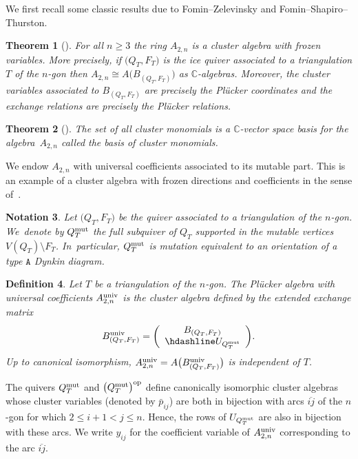 \documentclass[pdftex]{sigma}%
\newtheorem{Theorem}{Theorem}[section]
\newtheorem{Definition}[Theorem]{Definition}
\newtheorem{Notation}[Theorem]{Notation}
\numberwithin{equation}{section}
\begin{document}
We first recall some classic results due to Fomin--Zelevinsky and Fomin--Shapiro--Thurston.
\begin{Theorem}[\cite{FZ02}]
For all $n \geq 3$ the ring $A_{2,n}$ is a cluster algebra with frozen variables. More precisely, if $\big(Q_T,F_T\big)$ is the ice quiver associated to a triangulation $T$ of the $n$-gon then $A_{2,n}\cong A\big(B_{(Q_T,F_T)}\big)$ as $\mathbb C$-algebras. Moreover, the cluster variables associated to $B_{(Q_T,F_T)}$ are precisely the Pl\"ucker coordinates and the exchange relations are precisely the Pl\"ucker relations.
\end{Theorem}
\begin{Theorem}[\cite{FST08}]
The set of all cluster monomials is a $\mathbb{C}$-vector space basis for the algebra~$A_{2,n}$ called the {\it basis of cluster monomials}.
\end{Theorem}


We endow $A_{2,n}$ with universal coefficients associated to its mutable part. This is an example of a cluster algebra with frozen directions and coefficients in the sense of~\cite{BFMN}.

\begin{Notation}
Let $\big(Q_T, F_T\big)$ be the quiver associated to a triangulation of the $n$-gon.
We~denote by $Q_T^{\rm{mut}}$ the full subquiver of $Q_T$ supported in the mutable vertices $V(Q_T)\setminus F_T$. In~particular, $Q_T^{\rm{mut}}$ is mutation equivalent to an orientation of a type $\mathtt A$ Dynkin diagram.
\end{Notation}

\begin{Definition}
Let $T$ be a triangulation of the $n$-gon. The {\it Pl\"ucker algebra with universal coefficients} $A_{2,n}^{\rm{univ}}$ is the cluster algebra defined by the extended exchange matrix
\begin{displaymath}
B_{(Q_T,F_T)}^{\rm{univ}}=
\left(
\begin{array}{c}
 B_{(Q_T,F_T)} \\ \hdashline
 U_{Q^{\rm{mut}}_T}
\end{array}
\right)\!.
\end{displaymath}
Up to canonical isomorphism, $A_{2,n}^{\rm{univ}}=A\big(B_{(Q_T,F_T)}^{\rm{univ}}\big)$ is independent of $T$.
\end{Definition}

The quivers $Q_T^{\rm mut}$ and $\big(Q_T^{\rm mut}\big)^{\rm op}$ define canonically isomorphic cluster algebras whose cluster variables (denoted by $\bar p_{ij}$) are both in bijection with arcs $\overline{ij}$ of the $n$-gon for which $2\le i+1<j\le n$.
Hence, the rows of $U_{Q_T^{\rm mut}}$ are also in bijection with these arcs.
We write $y_{ij}$ for the coefficient variable of $A_{2,n}^{\rm univ}$ corresponding to the arc $\overline{ij}$.
\end{document}
